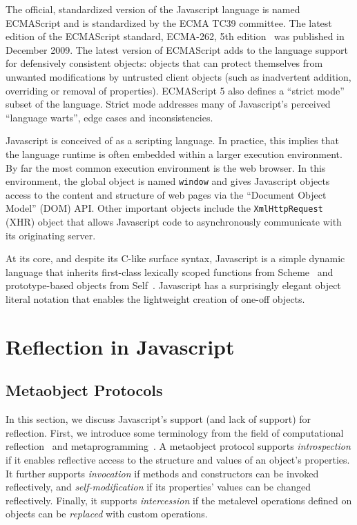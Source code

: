 \documentclass{acm_proc_article-sp}
\begin{document}
The official, standardized version of the Javascript language is named ECMAScript and is standardized by the ECMA TC39 committee. The latest edition of the ECMAScript standard, ECMA-262, 5th edition~\cite{ecma262} was published in December 2009. The latest version of ECMAScript adds to the language support for defensively consistent objects: objects that can protect themselves from unwanted modifications by untrusted client objects (such as inadvertent addition, overriding or removal of properties). ECMAScript 5 also defines a ``strict mode'' subset of the language. Strict mode addresses many of Javascript's perceived ``language warts'', edge cases and inconsistencies.

Javascript is conceived of as a scripting language. In practice, this implies that the language runtime is often embedded within a larger execution environment. By far the most common execution environment is the web browser. In this environment, the global object is named \texttt{window} and gives Javascript objects access to the content and structure of web pages via the ``Document Object Model'' (DOM) API. Other important objects include the \texttt{XmlHttpRequest} (XHR) object that allows Javascript code to asynchronously communicate with its originating server.

At its core, and despite its C-like surface syntax, Javascript is a simple dynamic language that inherits first-class lexically scoped functions from Scheme~\cite{scheme} and prototype-based objects from Self~\cite{self}. Javascript has a surprisingly elegant object literal notation that enables the lightweight creation of one-off objects.

\section{Reflection in Javascript}

\subsection{Metaobject Protocols}
In this section, we discuss Javascript's support (and lack of support) for reflection. First, we introduce some terminology from the field of computational reflection~\cite{maes-oopsla87} and metaprogramming~\cite{kiczales-artofthemop}. A metaobject protocol supports \emph{introspection} if it enables reflective access to the structure and values of an object's properties. It further supports \emph{invocation} if methods and constructors can be invoked reflectively, and \emph{self-modification} if its properties' values can be changed reflectively. Finally, it supports \emph{intercession} if the metalevel operations defined on objects can be \emph{replaced} with custom operations.
\end{document}
